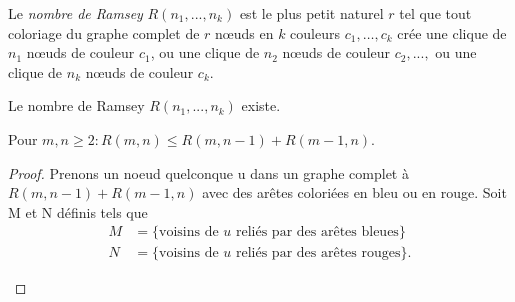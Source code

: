 \begin{mydef} 
Le \emph{nombre de Ramsey} $R(n_1 , ..., n_k)$ est le plus petit naturel $r$ tel que tout coloriage du graphe complet de $r$ nœuds en $k$ couleurs $c_1, \ldots, c_k$ crée une clique de $n_1$ nœuds de couleur $c_1$, ou une clique de $n_2$ nœuds de couleur $c_2, ...,$ ou une clique de $n_k$ nœuds de couleur $c_k$.
\end{mydef}

\begin{mytheo} 
Le nombre de Ramsey $R(n_1,...,n_k)$ existe.
\end{mytheo}

\begin{mytheo} 
  Pour $m, n \geq 2: R(m, n) \leq R(m, n-1) + R(m-1, n)$.
  \begin{proof}
     Prenons un noeud quelconque u dans un graphe complet à $R(m,n-1) + R(m-1,n)$
     avec des arêtes coloriées en bleu ou en rouge. Soit M et N définis tels que
     \begin{align*}
       M & = \{\text{voisins de }u\text{ reliés par des arêtes bleues}\}\\
       N & = \{\text{voisins de }u\text{ reliés par des arêtes rouges}\}.
     \end{align*}

\begin{figure} [!h]
\centering
\end{figure}
\end{proof}
\end{mytheo}
